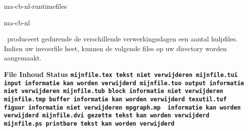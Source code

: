 \startonderdeel ma-cb-nl-runtimefiles

\produkt ma-cb-nl



\CONTEXT\ produceert gedurende de verschillende
verwerkingsslagen een aantal hulpfiles. Indien uw invoerfile
 heet, kunnen de volgende files op uw
directory worden aangemaakt.

\starttabel[|l|l|l|]
\HL
\NC \bf File          \NC \bf Inhoud        \NC \bf Status \NC\SR
\HL
\NC \tt mijnfile.tex  \NC tekst             \NC niet verwijderen      \NC\SR
\HL
\NC \tt mijnfile.tui  \NC input informatie  \NC kan worden verwijderd \NC\FR
\NC \tt mijnfile.tuo  \NC output informatie \NC niet verwijderen      \NC\MR
\NC \tt mijnfile.tub  \NC block informatie  \NC niet verwijderen      \NC\MR
\NC \tt mijnfile.tmp  \NC buffer informatie \NC kan worden verwijderd \NC\LR
\HL
\NC \tt texutil.tuf   \NC figuur informatie     \NC niet verwijderen      \NC\FR
\NC \tt mpgraph.mp    \NC \METAPOST\ informatie \NC kan worden verwijderd \NC\LR
\HL
\NC \tt mijnfile.dvi  \NC gezette tekst     \NC kan worden verwijderd \NC\FR
\NC \tt mijnfile.ps   \NC printbare tekst   \NC kan worden verwijderd \NC\LR
\HL
\stoptabel

\stoponderdeel
